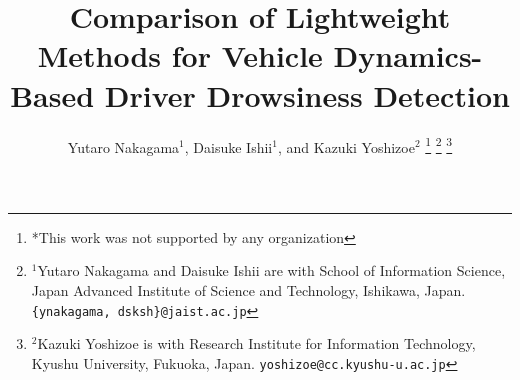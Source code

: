\documentclass[letterpaper, 10 pt, conference]{ieeeconf}  %
\begin{document}





\title{\LARGE \bf
Comparison of Lightweight Methods for Vehicle Dynamics-Based Driver Drowsiness Detection
}

\author{Yutaro Nakagama$^{1}$, Daisuke Ishii$^{1}$, and Kazuki Yoshizoe$^{2}$%
\thanks{*This work was not supported by any organization}%
\thanks{$^{1}$Yutaro Nakagama and Daisuke Ishii are with School of Information Science, Japan Advanced Institute of Science and Technology, Ishikawa, Japan. 
        {\tt\small \{ynakagama, dsksh\}@jaist.ac.jp}}%
\thanks{$^{2}$Kazuki Yoshizoe is with Research Institute for Information Technology, Kyushu University, Fukuoka, Japan.
        {\tt\small yoshizoe@cc.kyushu-u.ac.jp}}%
}
\end{document}
